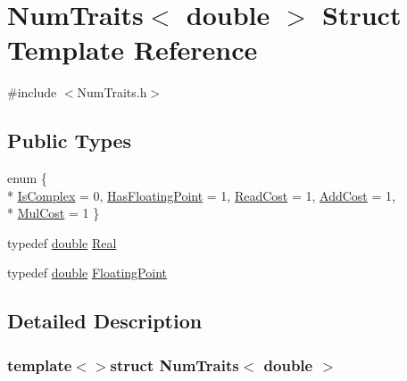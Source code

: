 \hypertarget{struct_num_traits_3_01double_01_4}{\section{Num\-Traits$<$ double $>$ Struct Template Reference}
\label{struct_num_traits_3_01double_01_4}
}


{\ttfamily \#include $<$Num\-Traits.\-h$>$}

\subsection*{Public Types}
\begin{DoxyCompactItemize}
\item 
enum \{ \\*
\hyperlink{struct_num_traits_3_01double_01_4_a4f3dc131ec7bf9bcb224a26b5134fd68a043d423a552e7f2cb99bf42ca13b57d9}{Is\-Complex} = 0, 
\hyperlink{struct_num_traits_3_01double_01_4_a4f3dc131ec7bf9bcb224a26b5134fd68a5188c5c10e5f5878556d5567dbe62a69}{Has\-Floating\-Point} = 1, 
\hyperlink{struct_num_traits_3_01double_01_4_a4f3dc131ec7bf9bcb224a26b5134fd68a43f2d17e2d3cdc4e749632b526d8138f}{Read\-Cost} = 1, 
\hyperlink{struct_num_traits_3_01double_01_4_a4f3dc131ec7bf9bcb224a26b5134fd68a9e460893274b3704f945ce9361991648}{Add\-Cost} = 1, 
\\*
\hyperlink{struct_num_traits_3_01double_01_4_a4f3dc131ec7bf9bcb224a26b5134fd68ab95523ebe8d6b60d8025c256ead1b6ec}{Mul\-Cost} = 1
 \}
\item 
typedef \hyperlink{_super_l_u_support_8h_a8956b2b9f49bf918deed98379d159ca7}{double} \hyperlink{struct_num_traits_3_01double_01_4_a44b9c524e9e6083f8984bab806372e21}{Real}
\item 
typedef \hyperlink{_super_l_u_support_8h_a8956b2b9f49bf918deed98379d159ca7}{double} \hyperlink{struct_num_traits_3_01double_01_4_a349392f066b0eb4a34e471ed18663fb1}{Floating\-Point}
\end{DoxyCompactItemize}


\subsection{Detailed Description}
\subsubsection*{template$<$$>$struct Num\-Traits$<$ double $>$}




